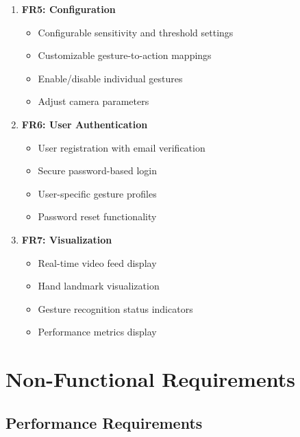 \documentclass[12pt,a4paper]{report}
\begin{document}
\begin{enumerate}
    \item \textbf{FR5: Configuration}
    \begin{itemize}
        \item Configurable sensitivity and threshold settings
        \item Customizable gesture-to-action mappings
        \item Enable/disable individual gestures
        \item Adjust camera parameters
    \end{itemize}
    
    \item \textbf{FR6: User Authentication}
    \begin{itemize}
        \item User registration with email verification
        \item Secure password-based login
        \item User-specific gesture profiles
        \item Password reset functionality
    \end{itemize}
    
    \item \textbf{FR7: Visualization}
    \begin{itemize}
        \item Real-time video feed display
        \item Hand landmark visualization
        \item Gesture recognition status indicators
        \item Performance metrics display
    \end{itemize}
\end{enumerate}

\section{Non-Functional Requirements}

\subsection{Performance Requirements}
\end{document}

